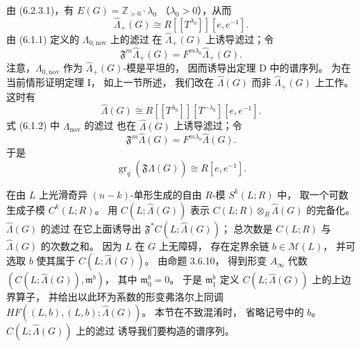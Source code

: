 由 (6.2.3.1)，有
$E(G)=\mathbb Z_{>0}\cdot\lambda_0$
（$\lambda_0>0$），从而
\begin{equation}
\widehat\Lambda_+(G)
\cong R[[T^{\lambda_0}]][e,e^{-1}].
\tag{6.2.6}\label{eq:6-2-6}
\end{equation}
由 (6.1.1) 定义的
$\Lambda_{0,\mathrm{nov}}$ 上的滤过
在 $\widehat\Lambda_+(G)$ 上诱导滤过；令
\[
\mathfrak F^m\widehat\Lambda_+(G)
=F^{m\lambda_0}\widehat\Lambda_+(G).
\]
注意，$\Lambda_{0,\mathrm{nov}}$
作为 $\widehat\Lambda_+(G)$-模是平坦的，
因而诱导出定理 D 中的谱序列。
为在当前情形证明定理 I，
如上一节所述，
我们改在 $\widehat\Lambda(G)$
而非 $\widehat\Lambda_+(G)$ 上工作。
这时有
\begin{equation}
\widehat\Lambda(G)
\cong R[[T^{\lambda_0}]]
[T^{-\lambda_0}][e,e^{-1}].
\tag{6.2.7}\label{eq:6-2-7}
\end{equation}
式 (6.1.2) 中
$\Lambda_{\mathrm{nov}}$ 的滤过
也在 $\widehat\Lambda(G)$ 上诱导滤过；令
\[
\mathfrak F^m\widehat\Lambda(G)
=F^{m\lambda_0}\widehat\Lambda(G).
\]
于是
\[
\operatorname{gr}_q
(\mathfrak F\widehat\Lambda(G))
\cong R[e,e^{-1}].
\]

在由 $L$ 上光滑奇异
$(n-k)$-单形生成的自由 $R$-模
$S^k(L;R)$ 中，
取一个可数生成子模 $C^k(L;R)$。
用 $C(L;\widehat\Lambda(G))$
表示
$C(L;R)\otimes_R\widehat\Lambda(G)$
的完备化。
$\widehat\Lambda(G)$ 的滤过
在它上面诱导出
$\mathfrak F^*C(L;\widehat\Lambda(G))$；
总次数是 $C(L;R)$ 与
$\widehat\Lambda(G)$ 的次数之和。
因为 $L$ 在 $G$ 上无障碍，
存在定界余链 $b\in\mathcal M(L)$，
并可选取 $b$ 使其属于
$C(L;\widehat\Lambda(G))$。
由命题 3.6.10，
得到形变 $A_\infty$ 代数
$(C(L;\widehat\Lambda(G)),\mathfrak m^b)$，
其中 $\mathfrak m_0^b=0$。
于是 $\mathfrak m_1^b$
定义 $C(L;\widehat\Lambda(G))$ 上的上边界算子，
并给出以此环为系数的形变弗洛尔上同调
$HF((L,b),(L,b);\widehat\Lambda(G))$。
本节在不致混淆时，
省略记号中的 $b$。
$C(L;\widehat\Lambda(G))$ 上的滤过
诱导我们要构造的谱序列。

